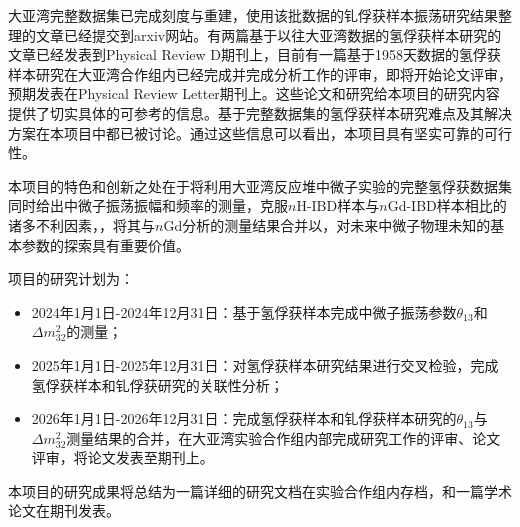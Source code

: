 \documentclass[a4paper,zihao=-4]{article}
\begin{document}
大亚湾完整数据集已完成刻度与重建，使用该批数据的钆俘获样本振荡研究结果整理的文章已经提交到arxiv网站。有两篇基于以往大亚湾数据的氢俘获样本研究的文章已经发表到Physical Review D期刊上，目前有一篇基于1958天数据的氢俘获样本研究在大亚湾合作组内已经完成并完成分析工作的评审，即将开始论文评审，预期发表在Physical Review Letter期刊上。这些论文和研究给本项目的研究内容提供了切实具体的可参考的信息。基于完整数据集的氢俘获样本研究难点及其解决方案在本项目中都已被讨论。通过这些信息可以看出，本项目具有坚实可靠的可行性。


本项目的特色和创新之处在于将利用大亚湾反应堆中微子实验的完整氢俘获数据集同时给出中微子振荡振幅和频率的测量，克服$n$H-IBD样本与$n$Gd-IBD样本相比的诸多不利因素，，将其与$n$Gd分析的测量结果合并以，对未来中微子物理未知的基本参数的探索具有重要价值。


项目的研究计划为：
\begin{itemize}
	\item 2024年1月1日-2024年12月31日：基于氢俘获样本完成中微子振荡参数$\theta_{13}$和$\Delta m_{32}^2$的测量；
	\item 2025年1月1日-2025年12月31日：对氢俘获样本研究结果进行交叉检验，完成氢俘获样本和钆俘获研究的关联性分析；
	\item 2026年1月1日-2026年12月31日：完成氢俘获样本和钆俘获样本研究的$\theta_{13}$与$\Delta m_{32}^2$测量结果的合并，在大亚湾实验合作组内部完成研究工作的评审、论文评审，将论文发表至期刊上。
\end{itemize}


本项目的研究成果将总结为一篇详细的研究文档在实验合作组内存档，和一篇学术论文在期刊发表。


\end{document}
